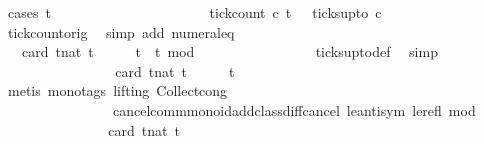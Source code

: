 \begin{isabellebody}
\ {\isacharparenleft}cases\ t\isanewline
\ \ \ \ \ \ \ \ \isamarkupfalse%
\ {}\isanewline
\ \ \ \ \ \ \ \ \ \ \isamarkupfalse%
\ {\isacartoucheopen}tick{\isacharunderscore}count\ c{}\ t\ {}\ {\isacharequal}\ ticks{\isacharunderscore}up{\isacharunderscore}to\ c{}\ {}{\isacartoucheclose}\isanewline
\ \ \ \ \ \ \ \ \ \ \ \ \isamarkupfalse%
\ tick{\isacharunderscore}count{\isacharunderscore}orig\ \isamarkupfalse%
\ {\isacharparenleft}simp\ add{\isacharcolon}\ numeral{\isacharunderscore}{}{\isacharunderscore}eq{\isacharunderscore}{}{\isacharparenright}\isanewline
\ \ \ \ \ \ \ \ \ \ \isamarkupfalse%
\ \isamarkupfalse%
\ {\isacartoucheopen}{\isachardot}{\isachardot}{\isachardot}\ {\isacharequal}\ card\ {\isacharbraceleft}t{\isacharcolon}{\isacharcolon}nat{\isachardot}\ t\ {\isasymle}\ {}\ {\isasymand}\ {}\ {\isasymle}\ t\ {\isasymand}\ {\isacharparenleft}t{\isacharminus}{}{\isacharparenright}\ mod\ {}\ {\isacharequal}\ {}{\isacharbraceright}{\isacartoucheclose}\isanewline
\ \ \ \ \ \ \ \ \ \ \ \ \isamarkupfalse%
\ ticks{\isacharunderscore}up{\isacharunderscore}to{\isacharunderscore}def\ \isamarkupfalse%
\ simp\isanewline
\ \ \ \ \ \ \ \ \ \ \isamarkupfalse%
\ \isamarkupfalse%
\ {\isacartoucheopen}{\isachardot}{\isachardot}{\isachardot}\ {\isasymle}\ \ card\ {\isacharbraceleft}t{\isacharcolon}{\isacharcolon}nat{\isachardot}\ t\ {\isasymle}\ {}\ {\isasymand}\ {}\ {\isasymle}\ t{\isacharbraceright}{\isacartoucheclose}\isanewline
\ \ \ \ \ \ \ \ \ \ \ \ \isamarkupfalse%
\ {\isacharparenleft}metis\ {\isacharparenleft}mono{\isacharunderscore}tags{\isacharcomma}\ lifting{\isacharparenright}\ Collect{\isacharunderscore}cong\isanewline
\ \ \ \ \ \ \ \ \ \ \ \ \ \ \ \ cancel{\isacharunderscore}comm{\isacharunderscore}monoid{\isacharunderscore}add{\isacharunderscore}class{\isachardot}diff{\isacharunderscore}cancel\ le{\isacharunderscore}antisym\ le{\isacharunderscore}refl\ mod{\isacharunderscore}{}{\isacharparenright}\isanewline
\ \ \ \ \ \ \ \ \ \ \isamarkupfalse%
\ \isamarkupfalse%
\ {\isacartoucheopen}{\isachardot}{\isachardot}{\isachardot}\ {\isacharequal}\ card\ {\isacharbraceleft}t{\isacharcolon}{\isacharcolon}nat{\isachardot}\ t\ {\isacharequal}\ {}{\isacharbraceright}{\isacartoucheclose}\ \isamarkupfalse%

\end{isabellebody}
